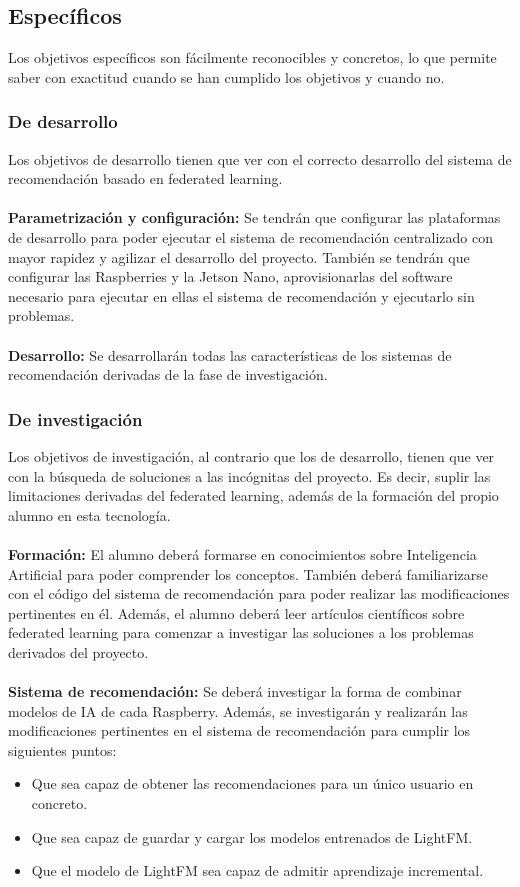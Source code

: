 \subsection{Específicos}
Los objetivos específicos son fácilmente reconocibles y concretos, lo que permite saber con exactitud cuando se han cumplido los objetivos y cuando no.

\subsubsection{De desarrollo}
Los objetivos de desarrollo tienen que ver con el correcto desarrollo del sistema de recomendación basado en federated learning. 
\\ \\
\textbf{Parametrización y configuración: }
Se tendrán que configurar las plataformas de desarrollo para poder ejecutar el sistema de recomendación centralizado con mayor rapidez y agilizar el desarrollo del proyecto. También se tendrán que configurar las Raspberries y la Jetson Nano, aprovisionarlas del software necesario para ejecutar en ellas el sistema de recomendación y ejecutarlo sin problemas.
\\ \\
\textbf{Desarrollo: }
Se desarrollarán todas las características de los sistemas de recomendación derivadas de la fase de investigación.

\subsubsection{De investigación}
Los objetivos de investigación, al contrario que los de desarrollo, tienen que ver con la búsqueda de soluciones a las incógnitas del proyecto. Es decir, suplir las limitaciones derivadas del federated learning, además de la formación del propio alumno en esta tecnología.
\\ \\
\textbf{Formación: }
El alumno deberá formarse en conocimientos sobre Inteligencia Artificial para poder comprender los conceptos. También deberá familiarizarse con el código del sistema de recomendación para poder realizar las modificaciones pertinentes en él. Además, el alumno deberá leer artículos científicos sobre federated learning para comenzar a investigar las soluciones a los problemas derivados del proyecto.
\\ \\
\textbf{Sistema de recomendación: }
Se deberá investigar la forma de combinar modelos de IA de cada Raspberry. Además, se investigarán y realizarán las modificaciones pertinentes en el sistema de recomendación para cumplir los siguientes puntos:
\begin{itemize}
    \item Que sea capaz de obtener las recomendaciones para un único usuario en concreto. 
    \item Que sea capaz de guardar y cargar los modelos entrenados de LightFM.
    \item Que el modelo de LightFM sea capaz de admitir aprendizaje incremental.
\end{itemize}

